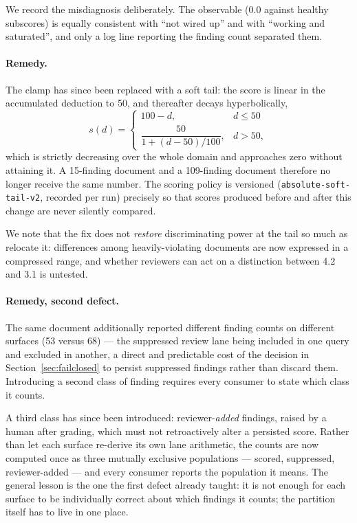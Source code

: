 \documentclass[10pt]{article}
\newcommand{\code}[1]{\texttt{\small #1}}
\begin{document}
We record the misdiagnosis deliberately. The observable (0.0 against healthy
subscores) is equally consistent with ``not wired up'' and with ``working and
saturated'', and only a log line reporting the finding count separated them.

\paragraph{Remedy.} The clamp has since been replaced with a soft tail: the
score is linear in the accumulated deduction to 50, and thereafter decays
hyperbolically,
\[
  s(d) = \begin{cases}
    100 - d, & d \le 50\\[2pt]
    \dfrac{50}{1 + (d-50)/100}, & d > 50,
  \end{cases}
\]
which is strictly decreasing over the whole domain and approaches zero without
attaining it. A 15-finding document and a 109-finding document therefore no
longer receive the same number. The scoring policy is versioned
(\code{absolute-soft-tail-v2}, recorded per run) precisely so that scores
produced before and after this change are never silently compared.

We note that the fix does not \emph{restore} discriminating power at the tail so
much as relocate it: differences among heavily-violating documents are now
expressed in a compressed range, and whether reviewers can act on a distinction
between 4.2 and 3.1 is untested.

\paragraph{Remedy, second defect.} The same document additionally reported
different finding counts on different surfaces (53 versus 68) --- the suppressed
review lane being included in one query and excluded in another, a direct and
predictable cost of the decision in Section~\ref{sec:failclosed} to persist
suppressed findings rather than discard them. Introducing a second class of
finding requires every consumer to state which class it counts.

A third class has since been introduced: reviewer-\emph{added} findings, raised
by a human after grading, which must not retroactively alter a persisted score.
Rather than let each surface re-derive its own lane arithmetic, the counts are
now computed once as three mutually exclusive populations --- scored, suppressed,
reviewer-added --- and every consumer reports the population it means. The
general lesson is the one the first defect already taught: it is not enough for
each surface to be individually correct about which findings it counts; the
partition itself has to live in one place.
\end{document}
